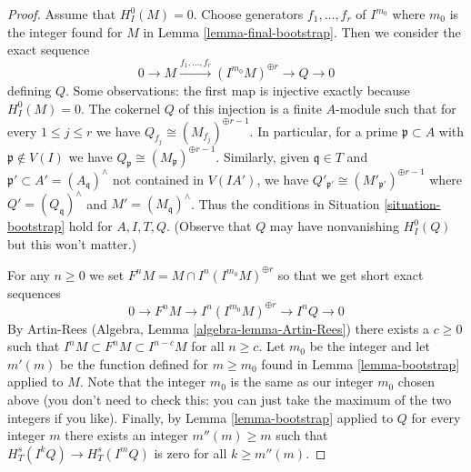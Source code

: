 \documentclass{stacks-project}
\theoremstyle{plain}
\theoremstyle{definition}
\theoremstyle{remark}
\numberwithin{equation}{subsection}
\begin{document}
\begin{proof}
\medskip\noindent
Assume that $H^0_I(M) = 0$. Choose generators
$f_1, \ldots, f_r$ of $I^{m_0}$ where $m_0$ is the
integer found for $M$ in Lemma \ref{lemma-final-bootstrap}.
Then we consider the exact sequence
$$
0 \to M \xrightarrow{f_1, \ldots, f_r}
(I^{m_0}M)^{\oplus r} \to Q \to 0
$$
defining $Q$. Some observations: the first map is injective
exactly because $H^0_I(M) = 0$. The cokernel $Q$ of this injection
is a finite $A$-module such that for every $1 \leq j \leq r$
we have $Q_{f_j} \cong (M_{f_j})^{\oplus r - 1}$.
In particular, for a prime $\mathfrak p \subset A$
with $\mathfrak p \not \in V(I)$ we have
$Q_\mathfrak p \cong (M_\mathfrak p)^{\oplus r - 1}$.
Similarly, given $\mathfrak q \in T$ and
$\mathfrak p' \subset A' = (A_\mathfrak q)^\wedge$
not contained in $V(IA')$, we have
$Q'_{\mathfrak p'} \cong (M'_{\mathfrak p'})^{\oplus r - 1}$
where $Q' = (Q_\mathfrak q)^\wedge$ and $M' = (M_\mathfrak q)^\wedge$.
Thus the conditions in Situation \ref{situation-bootstrap}
hold for $A, I, T, Q$. (Observe that $Q$ may have
nonvanishing $H^0_I(Q)$ but this won't matter.)

\medskip\noindent
For any $n \geq 0$ we set $F^nM = M \cap I^n(I^{m_0}M)^{\oplus r}$
so that we get short exact sequences
$$
0 \to F^nM \to I^n(I^{m_0}M)^{\oplus r} \to I^nQ \to 0
$$
By Artin-Rees (Algebra, Lemma \ref{algebra-lemma-Artin-Rees})
there exists a $c \geq 0$ such that
$I^n M \subset F^nM \subset I^{n - c}M$ for all $n \geq c$.
Let $m_0$ be the integer and let $m'(m)$
be the function defined for $m \geq m_0$
found in Lemma \ref{lemma-bootstrap}
applied to $M$. Note that the integer $m_0$
is the same as our integer $m_0$ chosen above (you don't need to
check this: you can just take the maximum of the two integers if
you like). Finally, by Lemma \ref{lemma-bootstrap}
applied to $Q$ for every integer $m$ there exists an integer
$m''(m) \geq m$ such that $H^s_T(I^kQ) \to H^s_T(I^mQ)$
is zero for all $k \geq m''(m)$.


\end{proof}
\end{document}
